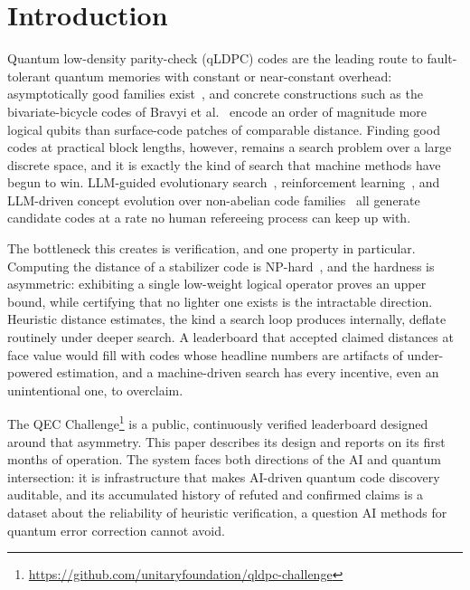 \documentclass{ceurart}
\begin{document}
\maketitle

\section{Introduction}

Quantum low-density parity-check (qLDPC) codes are the leading route to
fault-tolerant quantum memories with constant or near-constant overhead:
asymptotically good families exist~\cite{panteleev2022asymptotically}, and
concrete constructions such as the bivariate-bicycle codes of Bravyi et
al.~\cite{bravyi2024high} encode an order of magnitude more logical qubits
than surface-code patches of comparable distance. Finding good codes at
practical block lengths, however, remains a search problem over a large
discrete space, and it is exactly the kind of search that machine methods have
begun to win. LLM-guided evolutionary search~\cite{cruzbenito2026evolutionary},
reinforcement learning~\cite{he2025reinforcement}, and LLM-driven concept
evolution over non-abelian code families~\cite{liu2026concept} all generate
candidate codes at a rate no human refereeing process can keep up with.

The bottleneck this creates is verification, and one property in particular.
Computing the distance of a stabilizer code is
NP-hard~\cite{kapshikar2023hardness}, and the hardness is asymmetric:
exhibiting a single low-weight logical operator proves an upper bound, while
certifying that no lighter one exists is the intractable direction. Heuristic
distance estimates, the kind a search loop produces internally, deflate
routinely under deeper search. A leaderboard that accepted claimed distances
at face value would fill with codes whose headline numbers are artifacts of
under-powered estimation, and a machine-driven search has every incentive,
even an unintentional one, to overclaim.

The QEC Challenge\footnote{\url{https://github.com/unitaryfoundation/qldpc-challenge}}
is a public, continuously verified leaderboard designed around that asymmetry.
This paper describes its design and reports on its first months of operation.
The system faces both directions of the AI and quantum intersection: it is
infrastructure that makes AI-driven quantum code discovery auditable, and its
accumulated history of refuted and confirmed claims is a dataset about the
reliability of heuristic verification, a question AI methods for quantum error
correction cannot avoid.
\end{document}

